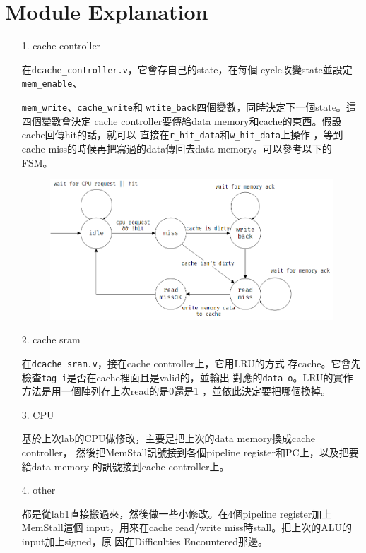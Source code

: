 \documentclass{article}
\begin{document}
\section*{Module Explanation}

\begin{enumerate}
    \item[1.] cache controller

        在\texttt{dcache_controller.v}，它會存自己的state，在每個
        cycle改變state並設定\texttt{mem_enable}、

        \texttt{mem_write}、\texttt{cache_write}和
        \texttt{wtite_back}四個變數，同時決定下一個state。這四個變數會決定
        cache controller要傳給data memory和cache的東西。假設cache回傳hit的話，就可以
        直接在\texttt{r_hit_data}和\texttt{w_hit_data}上操作
        ，等到cache miss的時候再把寫過的data傳回去data memory。可以參考以下的FSM。

        \begin{figure}[h]
            \centering
            \includegraphics[width=\textwidth]{1.png}
        \end{figure}

    \item[2.] cache sram

        在\texttt{dcache_sram.v}，接在cache controller上，它用LRU的方式
        存cache。它會先檢查\texttt{tag_i}是否在cache裡面且是valid的，並輸出
        對應的\texttt{data_o}。LRU的實作方法是用一個陣列存上次read的是0還是1
        ，並依此決定要把哪個換掉。

    \item[3.] CPU

        基於上次lab的CPU做修改，主要是把上次的data memory換成cache controller，
        然後把MemStall訊號接到各個pipeline register和PC上，以及把要給data memory
        的訊號接到cache controller上。

    \item[4.] other

        都是從lab1直接搬過來，然後做一些小修改。在4個pipeline register加上MemStall這個
        input，用來在cache read/write miss時stall。把上次的ALU的input加上signed，原
        因在Difficulties Encountered那邊。
\end{enumerate}
\end{document}
